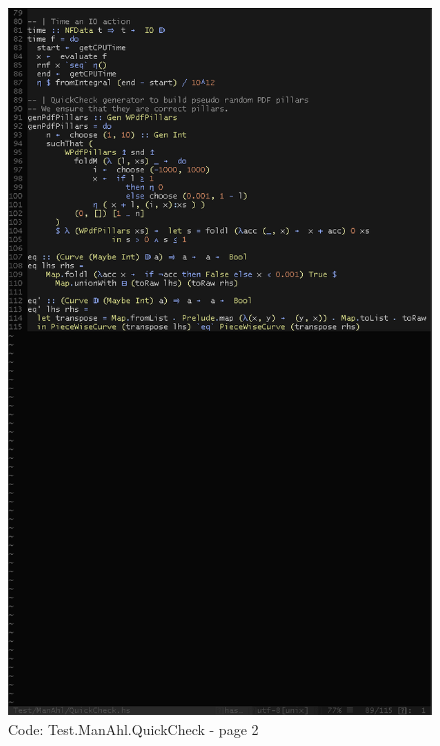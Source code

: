 \documentclass[12pt,a4paper,article]{memoir} %
\begin{document}
\begin{figure}[h!]
\centering
\includegraphics[width=1\textwidth]{img/code-test-quickcheck-2.png}
\caption{Code: Test.ManAhl.QuickCheck - page 2}
\label{fig:test.qc2}
\end{figure}
\end{document}

